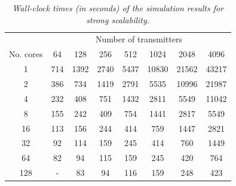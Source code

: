 \begin{table}
\caption{\textit{\emph{Wall-clock times (in seconds) of the simulation results
for strong scalability.\label{tab:results_strong_scaling}}}}


\centering

{\footnotesize }%
\begin{tabular}{cccccccc}
\cmidrule{2-8} 
 & \multicolumn{7}{c}{{\footnotesize Number of transmitters}}\tabularnewline\addlinespace
\midrule 
{\footnotesize No. cores} & {\footnotesize 64} & {\footnotesize 128} & {\footnotesize 256} & {\footnotesize 512} & {\footnotesize 1024} & {\footnotesize 2048} & {\footnotesize 4096}\tabularnewline
\midrule
{\footnotesize 1} & {\footnotesize 714} & {\footnotesize 1392} & {\footnotesize 2740} & {\footnotesize 5437} & {\footnotesize 10830} & {\footnotesize 21562} & {\footnotesize 43217}\tabularnewline
{\footnotesize 2} & {\footnotesize 386} & {\footnotesize 734} & {\footnotesize 1419} & {\footnotesize 2791} & {\footnotesize 5535} & {\footnotesize 10996} & {\footnotesize 21987}\tabularnewline
{\footnotesize 4} & {\footnotesize 232} & {\footnotesize 408} & {\footnotesize 751} & {\footnotesize 1432} & {\footnotesize 2811} & {\footnotesize 5549} & {\footnotesize 11042}\tabularnewline
{\footnotesize 8} & {\footnotesize 155} & {\footnotesize 242} & {\footnotesize 409} & {\footnotesize 754} & {\footnotesize 1441} & {\footnotesize 2817} & {\footnotesize 5549}\tabularnewline
{\footnotesize 16} & {\footnotesize 113} & {\footnotesize 156} & {\footnotesize 244} & {\footnotesize 414} & {\footnotesize 759} & {\footnotesize 1447} & {\footnotesize 2821}\tabularnewline
{\footnotesize 32} & {\footnotesize 92} & {\footnotesize 114} & {\footnotesize 159} & {\footnotesize 245} & {\footnotesize 414} & {\footnotesize 760} & {\footnotesize 1449}\tabularnewline
{\footnotesize 64} & {\footnotesize 82} & {\footnotesize 94} & {\footnotesize 115} & {\footnotesize 159} & {\footnotesize 245} & {\footnotesize 420} & {\footnotesize 764}\tabularnewline
{\footnotesize 128} & {\footnotesize -} & {\footnotesize 83} & {\footnotesize 94} & {\footnotesize 116} & {\footnotesize 159} & {\footnotesize 248} & {\footnotesize 423}\tabularnewline
\bottomrule
\end{tabular}
\end{table}


